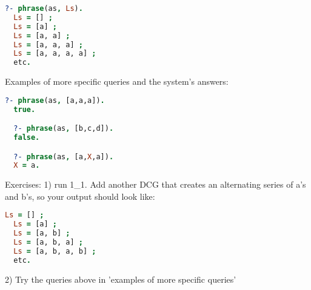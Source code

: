 \begin{lstlisting}[language=prolog]
  ?- phrase(as, Ls).
  Ls = [] ;
  Ls = [a] ;
  Ls = [a, a] ;
  Ls = [a, a, a] ;
  Ls = [a, a, a, a] ;
  etc.
\end{lstlisting}
Examples of more specific queries and the system's answers:

\begin{lstlisting}[language=prolog]
  ?- phrase(as, [a,a,a]).
  true.

  ?- phrase(as, [b,c,d]).
  false.

  ?- phrase(as, [a,X,a]).
  X = a.
\end{lstlisting}

Exercises:
1) run 1\_1. Add another DCG that creates an alternating series of a's and b's,
so your output should look like:
\begin{lstlisting}[language=prolog]
  Ls = [] ;
  Ls = [a] ;
  Ls = [a, b] ;
  Ls = [a, b, a] ;
  Ls = [a, b, a, b] ;
  etc.
\end{lstlisting}
2) Try the queries above in 'examples of more specific queries'


\secup
